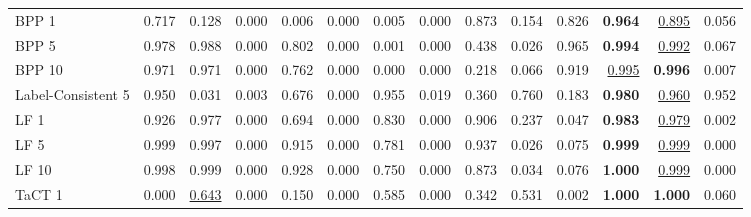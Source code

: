 \begin{table}[htbp]
\begin{adjustbox}{max width=\linewidth}
\begin{tabular}{lrrrrrrrrrrrrr}
BPP 1 & 0.717 & \textcolor{black!45}{0.128} & \textcolor{black!45}{0.000} & \textcolor{black!45}{0.006} & \textcolor{black!45}{0.000} & \textcolor{black!45}{0.005} & \textcolor{black!45}{0.000} & 0.873 & \textcolor{black!45}{0.154} & 0.826 & \textbf{0.964} & \underline{0.895} & \textcolor{black!45}{0.056} \\
BPP 5 & 0.978 & 0.988 & \textcolor{black!45}{0.000} & 0.802 & \textcolor{black!45}{0.000} & \textcolor{black!45}{0.001} & \textcolor{black!45}{0.000} & \textcolor{black!45}{0.438} & \textcolor{black!45}{0.026} & 0.965 & \textbf{0.994} & \underline{0.992} & \textcolor{black!45}{0.067} \\
BPP 10 & 0.971 & 0.971 & \textcolor{black!45}{0.000} & 0.762 & \textcolor{black!45}{0.000} & \textcolor{black!45}{0.000} & \textcolor{black!45}{0.000} & \textcolor{black!45}{0.218} & \textcolor{black!45}{0.066} & 0.919 & \underline{0.995} & \textbf{0.996} & \textcolor{black!45}{0.007} \\
Label-Consistent 5 & 0.950 & \textcolor{black!45}{0.031} & \textcolor{black!45}{0.003} & 0.676 & \textcolor{black!45}{0.000} & 0.955 & \textcolor{black!45}{0.019} & \textcolor{black!45}{0.360} & 0.760 & \textcolor{black!45}{0.183} & \textbf{0.980} & \underline{0.960} & 0.952 \\
LF 1 & 0.926 & 0.977 & \textcolor{black!45}{0.000} & 0.694 & \textcolor{black!45}{0.000} & 0.830 & \textcolor{black!45}{0.000} & 0.906 & \textcolor{black!45}{0.237} & \textcolor{black!45}{0.047} & \textbf{0.983} & \underline{0.979} & \textcolor{black!45}{0.002} \\
LF 5 & 0.999 & 0.997 & \textcolor{black!45}{0.000} & 0.915 & \textcolor{black!45}{0.000} & 0.781 & \textcolor{black!45}{0.000} & 0.937 & \textcolor{black!45}{0.026} & \textcolor{black!45}{0.075} & \textbf{0.999} & \underline{0.999} & \textcolor{black!45}{0.000} \\
LF 10 & 0.998 & 0.999 & \textcolor{black!45}{0.000} & 0.928 & \textcolor{black!45}{0.000} & 0.750 & \textcolor{black!45}{0.000} & 0.873 & \textcolor{black!45}{0.034} & \textcolor{black!45}{0.076} & \textbf{1.000} & \underline{0.999} & \textcolor{black!45}{0.000} \\
TaCT 1 & \textcolor{black!45}{0.000} & \underline{0.643} & \textcolor{black!45}{0.000} & \textcolor{black!45}{0.150} & \textcolor{black!45}{0.000} & 0.585 & \textcolor{black!45}{0.000} & \textcolor{black!45}{0.342} & 0.531 & \textcolor{black!45}{0.002} & \textbf{1.000} & \textbf{1.000} & \textcolor{black!45}{0.060} \\

\end{tabular}
\end{adjustbox}
\end{table}
